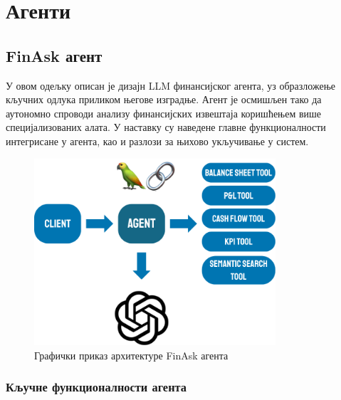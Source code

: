 \chapter{Агенти}

\section{FinAsk агент}

У овом одељку описан је дизајн LLM финансијског агента, уз образложење кључних одлука приликом његове изградње. Агент је осмишљен тако да аутономно спроводи анализу финансијских извештаја коришћењем више специјализованих алата. У наставку су наведене главне функционалности интегрисане у агента, као и разлози за њихово укључивање у систем.

\begin{figure}[!ht]
\centering
\includegraphics[width=0.8\textwidth]{images/agent.png}
\caption{Графички приказ архитектуре FinAsk агента}
\label{fig:agent_architecture}
\end{figure}

\subsection{Кључне функционалности агента}

